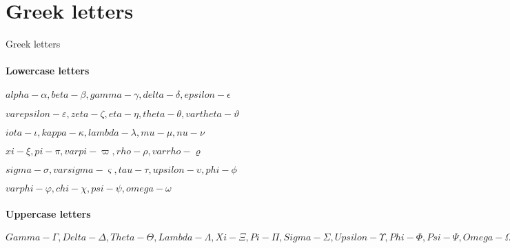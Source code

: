 \documentclass{article}[20200304]
\begin{document}
\section{Greek letters}
Greek letters

\paragraph{Lowercase letters}
\(alpha-\alpha, beta-\beta, gamma-\gamma, delta-\delta, epsilon-\epsilon\)

\(varepsilon-\varepsilon, zeta-\zeta, eta-\eta, theta- \theta, vartheta-\vartheta\)

\(iota-\iota, kappa-\kappa, lambda-\lambda, mu-\mu, nu-\nu\)

\(xi-\xi, pi-\pi, varpi-\varpi, rho-\rho, varrho-\varrho\)

\(sigma-\sigma, varsigma-\varsigma, tau-\tau, upsilon-\upsilon, phi-\phi\)

\(varphi-\varphi, chi-\chi, psi-\psi, omega-\omega\)

\paragraph{Uppercase letters}
\(Gamma-\Gamma, Delta-\Delta, Theta-\Theta, Lambda-\Lambda, Xi-\Xi, Pi-\Pi, Sigma-\Sigma, Upsilon-\Upsilon, Phi-\Phi, Psi-\Psi, Omega-\Omega\)
\end{document}
